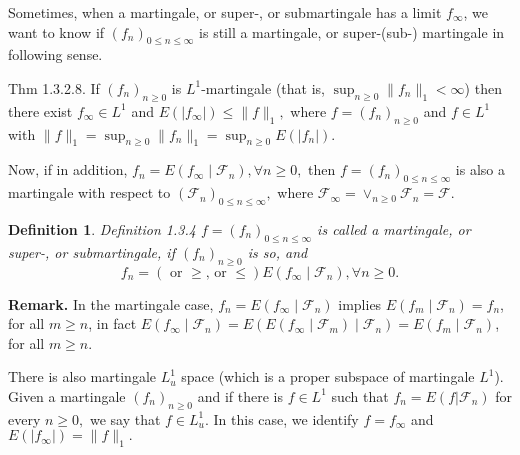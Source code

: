 \documentclass[reqno]{amsart}
\newtheorem{definition}[thm]{Definition}
\numberwithin{equation}{section}
\begin{document}
Sometimes, when a martingale, or super-, or submartingale has a limit $f_{\infty}$, we want to know if $\left(f_n\right)_{0 \leq n \leq \infty}$ is still a martingale, or super-(sub-) martingale in following sense.


Thm 1.3.2.8. If $(f_n)_{n\ge0}$ is $L^1$-martingale (that is, $\sup_{n\ge0}\|f_n\|_1<\infty$) then there exist $f_\infty \in L^1$ and $E(|f_\infty|) \le \|f\|_1,$ where $f=(f_n)_{n\ge0}$ and $f\in L^1$ with $\|f\|_1=\sup_{n\ge0}\|f_n\|_1=\sup_{n\ge0}E(|f_n|).$

Now, if in addition, $f_n= E\left(f_{\infty} \mid \mathcal{F}_n\right), \forall n \geq 0,$ then $f=\left(f_n\right)_{0 \leq n \leq \infty}$ is also a martingale with respect to $(\mathcal{F}_n)_{0\le n\le \infty},$ where $\mathcal{F}_\infty=\vee_{n\ge0} \mathcal{F}_n=\mathcal{F}.$

\begin{definition}
Definition 1.3.4 $f=\left(f_n\right)_{0 \leq n \leq \infty}$ is called a martingale, or super-, or submartingale, if $\left(f_n\right)_{n \geq 0}$ is so, and
$$
f_n=(\text { or } \geq \text {, or } \leq) E\left(f_{\infty} \mid \mathcal{F}_n\right), \forall n \geq 0 .
$$
\end{definition}


{\bf Remark.} In the martingale case, $f_n=E\left(f_{\infty} \mid \mathcal{F}_n\right)$ implies $E\left(f_m \mid \mathcal{F}_n\right)=f_n$, for all $m \geq n$, in fact $E\left(f_{\infty} \mid \mathcal{F}_n\right)=E\left(E\left(f_{\infty} \mid \mathcal{F}_m\right) \mid \mathcal{F}_n\right)=E\left(f_m \mid \mathcal{F}_n\right)$, for all $m \geq n$.

There is also martingale $L_u^1$ space (which is a proper subspace of martingale $L^1$). Given a martingale $(f_n)_{n\ge0}$ and if there is $f\in L^1$ such that $f_n=E(f|\mathcal{F}_n)$ for every $n\ge0,$ we say that $f\in L_u^1.$ In this case, we identify $f=f_\infty$ and $E(|f_\infty|)=\|f\|_1.$ 
\end{document}
